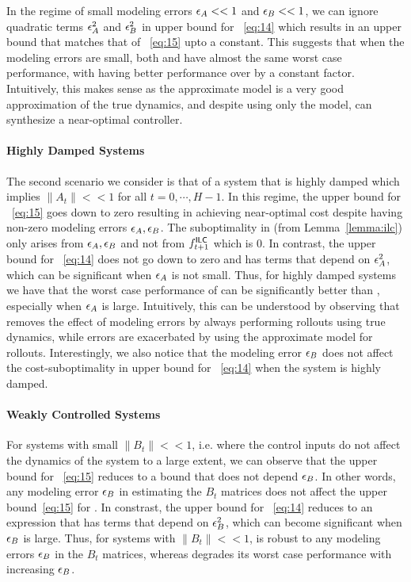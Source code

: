 In the regime of small modeling errors $\epsilon_A << 1$ and $\epsilon_B << 1$,
we can ignore quadratic terms $\epsilon_A^2$ and $\epsilon_B^2$ in upper
bound for \MM{}~\eqref{eq:14} which results in an upper bound that
matches that of \ILC{}~\eqref{eq:15} upto a constant. This suggests that
when the modeling errors are small, both \ILC{} and \MM{} have almost the
same worst case performance, with \ILC{} having better performance over
\MM{} by a constant factor. Intuitively, this makes sense as the approximate model is
a very good approximation of the true dynamics, and despite using only the
model, \MM{} can synthesize a near-optimal controller.

\paragraph{Highly Damped Systems}
\label{sec:highly-stable-system}

The second scenario we consider is that of a system that is highly damped
which implies $\|A_t\| << 1$ for all $t=0, \cdots,
H-1$. In this regime, the upper bound for \ILC{}~\eqref{eq:15} goes down
to zero resulting in \ILC{} achieving near-optimal cost despite having
non-zero modeling errors $\epsilon_A, \epsilon_B$. The suboptimality in \ILC{}
(from Lemma~\ref{lemma:ilc}) only
arises from $\epsilon_A, \epsilon_B$ and not from $f^\mathsf{ILC}_{t+1}$ which is
$0$.
In contrast, the upper
bound for \MM{}~\eqref{eq:14} does not go down to zero and has terms that
depend on $\epsilon_A^2$, which can be significant when $\epsilon_A$ is not
small. Thus, for highly damped systems we have that the worst case
performance of \ILC{} can be significantly better than \MM{}, especially
when $\epsilon_A$ is large. Intuitively, this can be understood by
observing that \ILC{} removes 
the effect of modeling errors by always performing rollouts using true
dynamics, 
while \MM{} errors are exacerbated by using the approximate
model for rollouts.
Interestingly, we also notice that the modeling
error $\epsilon_B$ does not affect the cost-suboptimality in
upper bound for \MM{}~\eqref{eq:14}  when the system is highly damped.

\paragraph{Weakly Controlled Systems}
\label{sec:small-b_t}

For systems with small $\|B_t\| << 1$, i.e. where the control inputs do not
affect the dynamics of the system to a large extent, we can observe
that the upper bound for \ILC{}~\eqref{eq:15} reduces to a bound that
does not depend $\epsilon_B$. In other words, any modeling error $\epsilon_B$ in
estimating the $B_t$ matrices does not affect the upper
bound~\eqref{eq:15} for \ILC{}.
In constrast, the upper bound for \MM{}~\eqref{eq:14} reduces to an
expression that has terms that depend
on $\epsilon_B^2$, which can become significant when $\epsilon_B$ is
large. Thus, for systems with $\|B_t\| << 1$, \ILC{} is robust to any
modeling errors $\epsilon_B$ in the $B_t$ matrices, whereas \MM{} degrades its
worst case performance with increasing $\epsilon_B$.

